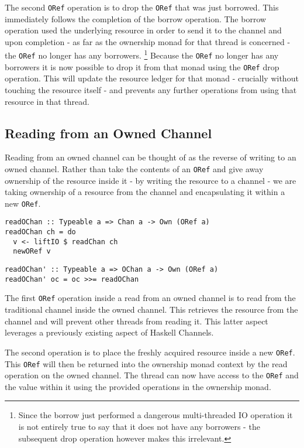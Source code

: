 \documentclass[onehalf,11pt]{beavtex}
\begin{document}
The second \texttt{ORef} operation is to drop the \texttt{ORef} that was just
borrowed. This immediately follows the completion of the borrow operation. The
borrow operation used the underlying resource in order to send it to the channel
and upon completion - as far as the ownership monad for that thread is
concerned - the \texttt{ORef} no longer has any borrowers.
\footnote{Since the borrow just performed a dangerous multi-threaded IO operation
  it is not entirely true to say that it does not have any borrowers - the
  subsequent drop operation however makes this irrelevant.}
Because the \texttt{ORef} no longer has any borrowers it is now possible to
drop it from that monad using the \texttt{ORef} drop operation.  This will
update the resource ledger for that monad - crucially without touching the
resource itself - and prevents any further operations from using that resource
in that thread.

\subsection{Reading from an Owned Channel}

Reading from an owned channel can be thought of as the reverse of
writing to an owned channel.  Rather than take the contents of an
\texttt{ORef} and give away ownership of the resource inside it - by writing the
resource to a channel - we are taking ownership of a resource from the channel
and encapsulating it within a new \texttt{ORef}.

\begin{verbatim}
readOChan :: Typeable a => Chan a -> Own (ORef a)
readOChan ch = do
  v <- liftIO $ readChan ch
  newORef v
\end{verbatim}

\begin{verbatim}
readOChan' :: Typeable a => OChan a -> Own (ORef a)
readOChan' oc = oc >>= readOChan
\end{verbatim}

The first \texttt{ORef} operation inside a read from an owned channel
is to read from the traditional channel inside the owned channel. This
retrieves the resource from the channel and will prevent other threads from
reading it. This latter aspect leverages a previously existing aspect of
Haskell Channels. %

The second operation is to place the freshly acquired resource inside a new
\texttt{ORef}.  This \texttt{ORef} will then be returned into the
ownership monad context by the read operation on the
owned channel.  The thread can now have access to the \texttt{ORef}
and the value within it using the provided operations in the
ownership monad.
\end{document}
